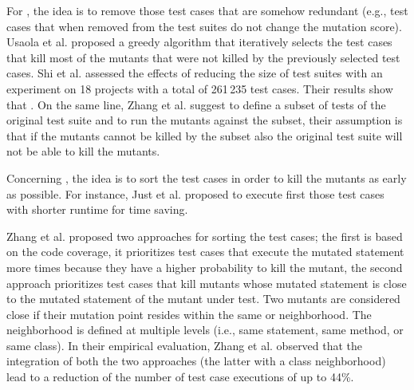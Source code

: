 For , the idea is to remove those test cases that are somehow redundant (e.g., test cases that when removed from the test suites do not change the mutation score).
Usaola et al. \cite{usaola2012reduction} proposed a greedy algorithm that iteratively selects  the test cases that kill most of the mutants that were not killed by the previously selected test cases. 
Shi et al. \cite{shi2014balancing} assessed the effects of reducing the size of test suites with an experiment on 18 projects with a total of 261\,235 test cases. Their results show that . 
On the same line, Zhang et al. \cite{zhang2013faster} suggest to define a subset of tests of the original test suite and to run the mutants against the subset, their assumption is that if the mutants cannot be killed by the subset also the original test suite will not be able to kill the mutants.

Concerning , the idea is to sort the test cases in order to kill the mutants as early as possible. For instance, Just et al. \cite{just2012using} proposed to execute first those test cases with shorter runtime for time saving.


Zhang et al. \cite{zhang2013faster} proposed two approaches for sorting the test cases; the first is based on the code coverage, it prioritizes test cases that execute the mutated statement more times because they have a higher probability to kill the mutant, 
the second approach prioritizes test cases that kill mutants whose mutated statement is close to the mutated statement of the mutant under test. Two mutants are considered close if their mutation point resides within the same or neighborhood. The neighborhood is defined at multiple levels (i.e., same statement, same method, or same class).
In their empirical evaluation, Zhang et al. observed that the integration of both the two approaches (the latter with a class neighborhood) lead to a reduction of the number of test case executions of up to 44\%.



